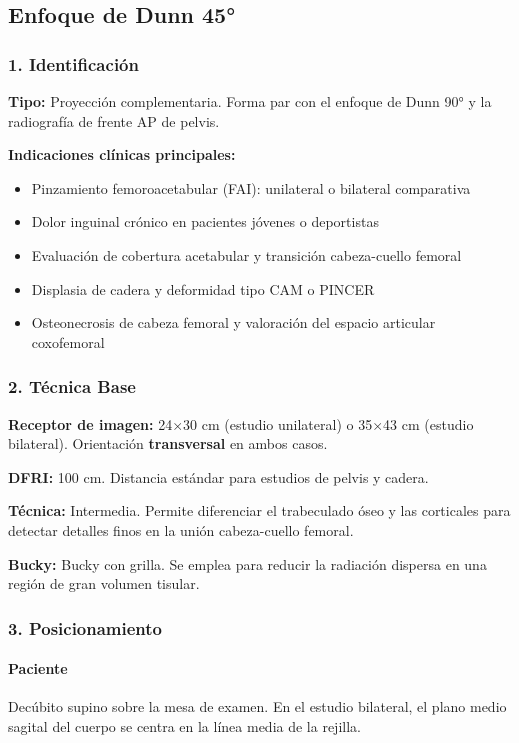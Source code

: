 	\subsection{Enfoque de Dunn 45°}
	
	\subsubsection*{1. Identificación}
	
	\textbf{Tipo:} Proyección complementaria. Forma par con el enfoque de Dunn 90° y la radiografía de frente AP de pelvis.
	
	\textbf{Indicaciones clínicas principales:}
	\begin{itemize}
		\item Pinzamiento femoroacetabular (FAI): unilateral o bilateral comparativa
		\item Dolor inguinal crónico en pacientes jóvenes o deportistas
		\item Evaluación de cobertura acetabular y transición cabeza-cuello femoral
		\item Displasia de cadera y deformidad tipo CAM o PINCER
		\item Osteonecrosis de cabeza femoral y valoración del espacio articular coxofemoral
	\end{itemize}
	
	\subsubsection*{2. Técnica Base}
	
	\textbf{Receptor de imagen:} 24$\times$30 cm (estudio unilateral) o 35$\times$43 cm (estudio bilateral). Orientación \textbf{transversal} en ambos casos.
	
	\textbf{DFRI:} 100 cm. Distancia estándar para estudios de pelvis y cadera.
	
	\textbf{Técnica:} Intermedia. Permite diferenciar el trabeculado óseo y las corticales para detectar detalles finos en la unión cabeza-cuello femoral.
	
	\textbf{Bucky:} Bucky con grilla. Se emplea para reducir la radiación dispersa en una región de gran volumen tisular.
	
	\subsubsection*{3. Posicionamiento}
	
	\paragraph{Paciente}
	Decúbito supino sobre la mesa de examen. En el estudio bilateral, el plano medio sagital del cuerpo se centra en la línea media de la rejilla.
	
